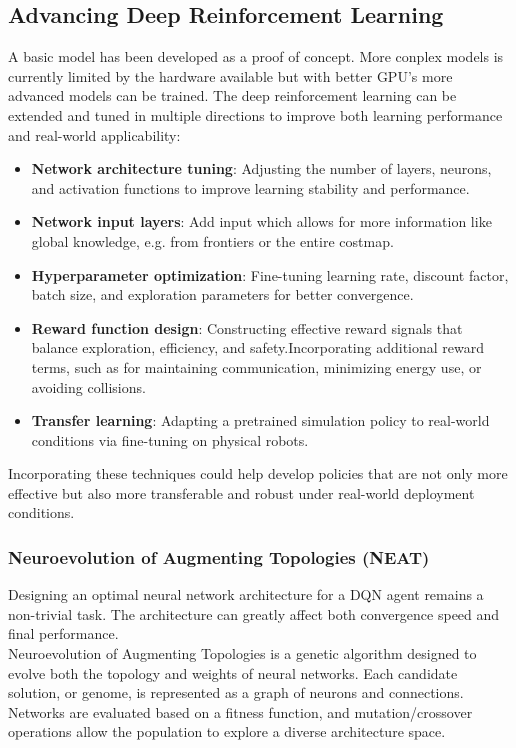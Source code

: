 \subsection{Advancing Deep Reinforcement Learning}
A basic model has been developed as a proof of concept. More conplex models is currently limited by the hardware available but with better GPU's more advanced models can be trained.
The deep reinforcement learning can be extended and tuned in multiple directions to improve both learning performance and real-world applicability:

\begin{itemize}
  \item \textbf{Network architecture tuning}: Adjusting the number of layers, neurons, and activation functions to improve learning stability and performance.
  \item \textbf{Network input layers}: Add input which allows for more information like global knowledge, e.g. from frontiers or the entire costmap.
  \item \textbf{Hyperparameter optimization}: Fine-tuning learning rate, discount factor, batch size, and exploration parameters for better convergence.
  \item \textbf{Reward function design}: Constructing effective reward signals that balance exploration, efficiency, and safety.Incorporating additional reward terms, such as for maintaining communication, minimizing energy use, or avoiding collisions.
  \item \textbf{Transfer learning}: Adapting a pretrained simulation policy to real-world conditions via fine-tuning on physical robots.
\end{itemize}

Incorporating these techniques could help develop policies that are not only more effective but also more transferable and robust under real-world deployment conditions.

\subsubsection{Neuroevolution of Augmenting Topologies (NEAT)}
Designing an optimal neural network architecture for a DQN agent remains a non-trivial task. The architecture can greatly affect both convergence speed and final performance.\\

Neuroevolution of Augmenting Topologies \cite{neat} is a genetic algorithm designed to evolve both the topology and weights of neural networks. Each candidate solution, or genome, is represented as a graph of neurons and connections. Networks are evaluated based on a fitness function, and mutation/crossover operations allow the population to explore a diverse architecture space.\\

